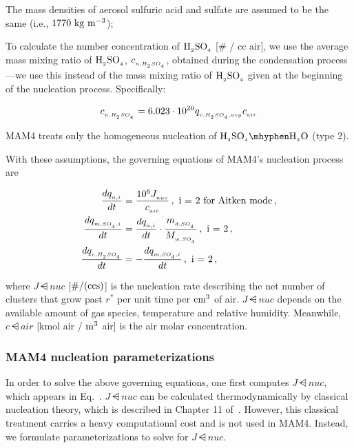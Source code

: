 \begin{assume}
  The mass densities of aerosol sulfuric acid and sulfate are assumed to be the
  same (i.e., $\rm 1770~kg~m^{-3}$);
\end{assume}

\begin{assume}
  To calculate the number concentration of $\rm H_{_2}SO_{_4}$ [\# / cc air], we use the
  average mass mixing ratio of $\rm H_{_2}SO_{_4}$, $c_{_{n,H_{_2}SO_{_4}}}$, obtained during the
  condensation process---we use this instead of the mass mixing ratio of $\rm H_{_2}SO_{_4}$
  given at the beginning of the nucleation process. Specifically:

  $$c_{_{n,H_{_2}SO_{_4}}} = 6.023 \cdot 10^{20} q_{_{v,H_{_2}SO_{_4},avg}} c_{_{air}}$$

\end{assume}

\begin{assume}
  MAM4 treats only the homogeneous nucleation of $\rsag \mhyphen \rwater$
  (type 2).
\end{assume}

With these assumptions, the governing equations of MAM4's nucleation process
are

\begin{align}
  \frac{dq\dsub{n,i}}{dt} &= \frac{10^6 J\dsub{nuc}}{c\dsub{air}} \,, \text{ i = 2 for Aitken mode} \,, \labeleq{nuc:jnuc} \\
  \frac{d\amass{\asf}}{dt} &= \frac{dq\dsub{n,i}}{dt} \cdot \frac{m\dsub{d,\asf}}{\mw{\asf}} \,, \text{ i = 2} \,, \labeleq{nuc:amass} \\
  \frac{d\vmass{\sag}}{dt} &= -\frac{d\amass{\asf}}{dt} \,, \text{ i = 2} \,, \labeleq{nuc:vmass}
\end{align}

where $J\dsub{nuc}$ [$\rm \# / (cc s)$] is the nucleation rate describing the
net number of clusters that grow past $r^*$ per unit time per $\rm cm^{3}$ of
air. $J\dsub{nuc}$ depends on the available amount of gas species, temperature
and relative humidity. Meanwhile, $c\dsub{air}$ [kmol air / $\rm m^3$ air] is
the air molar concentration.

\subsubsection{MAM4 nucleation parameterizations} 

In order to solve the above governing equations, one first computes $J\dsub{nuc}$,
which appears in Eq.~. $J\dsub{nuc}$ can be calculated
thermodynamically by classical nucleation theory, which is described in
Chapter 11 of~\cite{seinfeld-2006-acp}. However, this classical treatment
carries a heavy computational cost and is not used in MAM4. Instead, we
formulate parameterizations to solve for $J\dsub{nuc}$.

